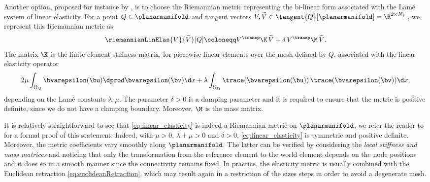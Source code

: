Another option, proposed for instance by \cite{SchulzSiebenbornWelker:2016:1}, is to choose the Riemannian metric representing the bi-linear form associated with the Lamé system of linear elasticity.
For a point $Q\in\planarmanifold$ and tangent vectors $V,\widetilde{V}\in\tangent{Q}[\planarmanifold] = \R^{2 \times N_V}$, we represent this Riemannian metric as
\begin{equation}
	\label{eq:linear_elasticity}
	\riemannianLinElas{V}{\widetilde{V}}[Q]
	\coloneqq
	V^\transp \K \, \widetilde{V}
	+
	\delta \, V^\transp \M \, \widetilde{V}
	.
\end{equation}
The matrix $\K$ is the finite element stiffness matrix, for piecewise linear elements over the mesh defined by $Q$, associated with the linear elasticity operator
\begin{equation*}
	2 \mu \int_{\Omega_Q} \bvarepsilon(\bu) \dprod \bvarepsilon(\bv) \d x + \lambda \int_{\Omega_Q} \trace(\bvarepsilon(\bu)) \, \trace(\bvarepsilon(\bv)) \d x
	,
\end{equation*}
depending on the Lamé constants $\lambda,\mu$.
The parameter $\delta > 0$ is a damping parameter and it is required to ensure that the metric is positive definite, since we do not have a clamping boundary.
Moreover, $\M$ is the mass matrix.

It is relatively straightforward to see that \eqref{eq:linear_elasticity} is indeed a Riemannian metric on $\planarmanifold$, we refer the reader to~\cite[Theorem~5.1.1]{LoayzaRomero:2022:1} for a formal proof of this statement.
Indeed, with $\mu > 0$, $\lambda + \mu > 0$ and $\delta > 0$, \eqref{eq:linear_elasticity} is symmetric and positive definite.
Moreover, the metric coefficients vary smoothly along $\planarmanifold$.
The latter can be verified by considering the \emph{local stiffness and mass matrices} and noticing that only the transformation from the reference element to the world element depends on the node positions and it does so in a smooth manner since the connectivity remains fixed.
In practice, the elasticity metric is usually combined with the Euclidean retraction \eqref{eq:euclideanRetraction}, which may result again in a restriction of the sizes steps in order to avoid a degenerate mesh.

